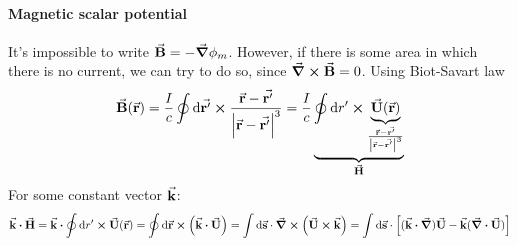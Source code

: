 \paragraph{Magnetic scalar potential}
It's impossible to write $\va{B} = -\grad{\phi_m}$. However, if there is some area in which there is no current, we can try to do so, since $\curl{\va{B}} = 0$.
Using Biot-Savart law
$$\va{B}(\va{r})= \frac{I}{c} \oint \dd{\va{r'}} \cross \frac{\va{r}-\va{r'}}{\abs{\va{r}-\va{r'}}^3} = \frac{I}{c} \underbrace{\oint \dd{r'} \cross \underbrace{\va{U}(\va{r})}_{\frac{\va{r}-\va{r'}}{\abs{\va{r}-\va{r'}}^3}}}_{\va{H}}$$
For some constant vector $\va{k}$:
$$\va{k}\vdot \va{H} = \va{k} \vdot \oint \dd{r'} \cross \va{U}(\va{r}) = \oint \dd{\va{r}} \cross \qty(\va{k} \vdot \va{U}) = \int \dd{\va{s}} \cdot \curl(\va{U} \cross \va{k}) = \int \dd{\va{s}} \cdot \qty[ (\va{k} \vdot \grad)\va{U} - \va{k} (\div{\va{U}})] $$